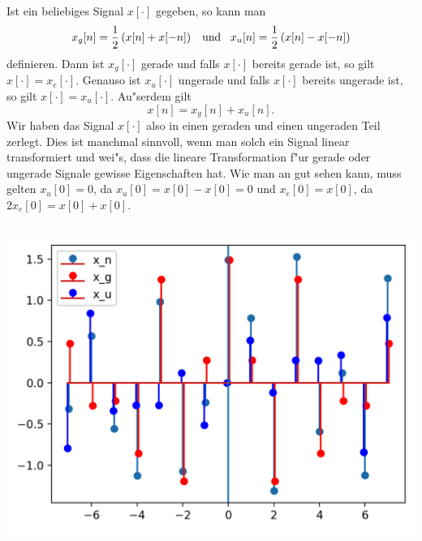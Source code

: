 Ist ein beliebiges Signal $x[\cdot]$ gegeben, so kann man
\[
    x_g[n] = \frac 12 \left(x[n] + x[-n]\right)
    {\hspace{3mm} \text{und} \hspace{3mm}}
    x_u[n] = \frac 12 \left(x[n] - x[-n]\right)
\]
definieren.
Dann ist $x_g[\cdot]$ gerade und falls $x[\cdot]$ bereits gerade ist, so gilt $x[\cdot] = x_e[\cdot]$.
Genauso ist $x_u[\cdot]$ ungerade und falls $x[\cdot]$ bereits ungerade ist, so gilt $x[\cdot] = x_u[\cdot]$.
Au"serdem gilt
\[
x[n] = x_g[n] + x_u[n].
\]
Wir haben das Signal $x[\cdot]$ also in einen geraden und einen ungeraden Teil zerlegt.
Dies ist manchmal sinnvoll, wenn man solch ein Signal linear transformiert und wei"s, dass die lineare Transformation f"ur gerade oder ungerade Signale gewisse Eigenschaften hat.
Wie man an  gut sehen kann, muss gelten $x_u[0] =0$, da $x_u[0] = x[0] - x[0] = 0$ und $x_e[0] = x[0]$, da $2 x_e[0] = x[0] + x[0]$.
%
\begin{listing}
    \noindent
    \begin{minipage}{0.49\textwidth}
        \strut\vspace*{-\baselineskip}\newline
        \inputminted[firstline=4]{python3}{code/even_odd.py}
    \end{minipage}%
    \begin{minipage}{0.49\textwidth}
        \strut\vspace*{-\baselineskip}\newline
        \includegraphics[width=\textwidth]{code/even_odd.png}
    \end{minipage}
    \label{py:even_odd}
\end{listing}
%
